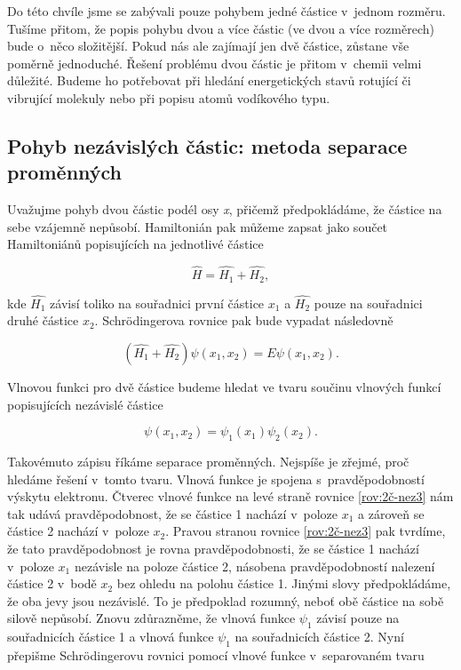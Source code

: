 Do této chvíle jsme se zabývali pouze pohybem jedné částice v~jednom rozměru. Tušíme přitom, že popis pohybu dvou a více částic (ve dvou a více rozměrech) bude o~něco složitější. Pokud nás ale zajímají jen dvě částice, zůstane vše poměrně jednoduché. Řešení problému dvou částic je přitom v~chemii velmi důležité. Budeme ho potřebovat při hledání energetických stavů rotující či vibrující molekuly nebo při popisu atomů vodíkového typu.

\subsection{Pohyb nezávislých částic: metoda separace proměnných}

 Uvažujme pohyb dvou částic podél osy \textit{x}, přičemž předpokládáme, že částice na sebe vzájemně nepůsobí. Hamiltonián pak můžeme zapsat jako součet Hamiltoniánů popisujících na jednotlivé částice

\begin{equation}
\hat{H}=\hat{H_{1}}+\hat{H_{2}},
\label{rov:2č-nez1}
\end{equation}

\noindent kde $\hat{H_{1}}$ závisí toliko na souřadnici první částice $x_{1}$ a $\hat{H_{2}}$ pouze na souřadnici druhé částice $x_{2}$. Schr\"odingerova rovnice pak bude vypadat následovně

\begin{equation}
(\hat{H_{1}}+\hat{H_{2}})\psi(x_{1},x_{2})=E\psi(x_{1},x_{2}).
\label{rov:2č-nez2}
\end{equation}

Vlnovou funkci pro dvě částice budeme hledat ve tvaru součinu vlnových funkcí popisujících nezávislé částice

\begin{equation}
\psi(x_{1},x_{2})=\psi_{1}(x_{1})\psi_{2}(x_{2}).
\label{rov:2č-nez3}
\end{equation}

Takovémuto zápisu říkáme separace proměnných. Nejspíše je zřejmé, proč hledáme řešení v~tomto tvaru. Vlnová funkce je spojena s~pravděpodobností výskytu elektronu. Čtverec vlnové funkce na levé straně rovnice \eqref{rov:2č-nez3} nám tak udává pravděpodobnost, že se částice 1 nachází v~poloze $x_{1}$ a zároveň se částice 2 nachází v~poloze $x_{2}$. Pravou stranou rovnice \eqref{rov:2č-nez3} pak tvrdíme, že tato pravděpodobnost je rovna pravděpodobnosti, že se částice 1 nachází v~poloze  $x_{1}$ nezávisle na poloze částice 2, násobena pravděpodobností nalezení částice 2 v~bodě $x_{2}$ bez ohledu na polohu částice 1. Jinými slovy předpokládáme, že oba jevy jsou nezávislé. To je předpoklad rozumný, neboť obě částice na sobě silově nepůsobí. Znovu zdůrazněme, že vlnová funkce $\psi_{1}$ závisí pouze na souřadnicích částice 1 a vlnová funkce $\psi_{1}$ na souřadnicích částice 2. Nyní přepišme Schr\"odingerovu rovnici pomocí vlnové funkce v~separovaném tvaru

